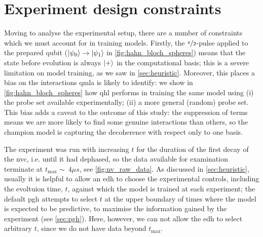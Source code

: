 \section{Experiment design constraints}\label{sec:nv_constraints}
Moving to analyse the experimental setup, there are a number of constraints which we must account for in 
    training models. 
Firstly, the $\nicefrac{\pi}{2}$-pulse applied to the prepared qubit ($\ket{\psi_0} \rightarrow \ket{\psi_1}$ in \cref{fig:hahn_bloch_spheres})
    means that the state before evolution is always $\ket{+}$ in the computational basis;
    this is a severe limitation on model training, as we saw in \cref{sec:heuristic}. 
Moreover, this places a bias on the interactions \gls{qmla} is likely to identify:
    we show in \cref{fig:hahn_bloch_spheres} how \gls{qhl} performs in training the same model using 
    (i) the \gls{probe} set available experimentally; (ii) a more general (random) \gls{probe} set. 
This bias adds a caveat to the outcome of this study:
    the suppression of terms means we are more likely to find some genuine interactions than others, 
    so the \gls{champion model} is capturing the decoherence with respect only to one basis.
\par

The experiment was run with increasing $t$ for the duration of the first decay of the \gls{nvc}, 
    i.e. until it had dephased, 
    so the data available for examination terminate at $t_{\textrm{max}} \sim \ 4 \mu s$, see \cref{fig:nv_raw_data}. 
As discussed in \cref{sec:heuristic}, usually it is helpful to allow an \gls{edh} to
    choose the experimental controls, including the evoltuion time, $t$, against which 
    the model is trained at each experiment;
    the default \gls{pgh} attempts to select $t$ at the upper boundary of times 
    where the model is expected to be predictive, to maximise the information gained by the experiment (see \cref{sec:pgh}). 
Here, however, we can not allow the \gls{edh} to select arbitrary $t$, 
    since we do not have data beyond $t_{\textrm{max}}$. 

\par 

